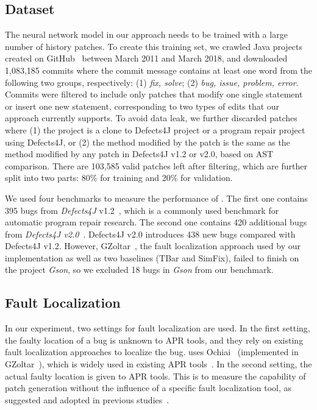 \subsection{Dataset}
The neural network model in our approach needs to be trained with a large number of history patches. To create this training set, we crawled Java projects created on GitHub~\cite{github} between March 2011 and March 2018, and downloaded 1,083,185 commits where the commit message contains at least one word from the following two groups, respectively: (1) \textit{fix, solve}; (2) \textit{bug, issue, problem, error}. Commits were filtered to include only patches that modify one single statement or insert one new statement, corresponding to two types of edits that our approach currently supports. To avoid data leak, we further discarded patches where (1) the project is a clone to Defects4J project or a program repair project using Defects4J, or (2) the method modified by the patch is the same as the method modified by any patch in Defects4J v1.2 or v2.0, based on AST comparison. There are 103,585 valid patches left after filtering, 
which are further split into two parts: 80\% for training and 20\% for validation.

We used four benchmarks to measure the performance of \techname. The first one contains 395 bugs from \textit{Defects4J} v1.2~\cite{defects4j}, which is a commonly used benchmark for automatic program repair research. The second one contains 420 additional bugs from \textit{Defects4J v2.0}~\cite{defects4j}. %
Defects4J v2.0 introduces 438 new bugs compared with Defects4J v1.2. However, GZoltar~\cite{GZoltar}, the fault localization approach used by our implementation as well as two baselines (TBar and SimFix), failed to finish on the project {\it Gson}, so we excluded 18 bugs in {\it Gson} from our benchmark. 

\subsection{Fault Localization}
In our experiment, two settings for fault localization are used. In the first setting, the faulty location of a bug is unknown to APR tools, and they rely on existing fault localization approaches to localize the bug. \techname uses Ochiai~\cite{ochiai} (implemented in GZoltar~\cite{GZoltar}), which is widely used in existing APR tools~\cite{liu2019tbar, 2018Shaping}. In the second setting, the actual faulty location is given to APR tools. This is to measure the capability of patch generation without the influence of a specific fault localization tool, as suggested and adopted in previous studies~.


